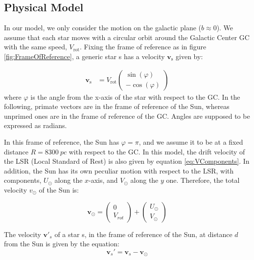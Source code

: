 \subsection{Physical Model}\label{subsec:PhysicalModel}


In our model, we only consider the motion on the galactic plane ($b\approx0$). We assume that each star moves with a circular orbit around the Galactic Center GC with the same speed, $V_{\text{rot}}$. Fixing the frame of reference as in figure \ref{fig:FrameOfReference}, a generic star s has a velocity $\bm{v}_{\text{s}}$ given by:

\begin{equation}\label{eq:VComponents}
    \begin{aligned}
        \bm{v}_{\text{s}} &= V_{\text{rot}}\begin{pmatrix} \sin(\varphi) \\ -\cos(\varphi) \end{pmatrix}
    \end{aligned}
\end{equation}
\noindent
where $\varphi$ is the angle from the x-axis of the star with respect to the GC. In the following, primate vectors are in the frame of reference of the Sun, whereas unprimed ones are in the frame of reference of the GC. Angles are supposed to be expressed as radians.

In this frame of reference, the Sun has $\varphi = \pi$, and we assume it to be at a fixed distance $R=\qty{8300}{pc}$ with respect to the GC. In this model, the drift velocity of the LSR (Local Standard of Rest) is also given by equation \ref{eq:VComponents}. In addition, the Sun has its own peculiar motion with respect to the LSR, with components, $U_{\odot}$ along the $x$-axis, and $V_{\odot}$ along the $y$ one. Therefore, the total velocity $v_{\odot}$ of the Sun is:

\begin{equation}\label{eq:VSun}
    \bm{v}_{\odot} = \begin{pmatrix} 0 \\ V_{rot} \end{pmatrix} + \begin{pmatrix} U_{\odot} \\ V_{\odot} \end{pmatrix}
\end{equation}

\noindent
The velocity $\bm{v'}_s$ of a star s, in the frame of reference of the Sun, at distance $d$ from the Sun is given by the equation:
\begin{equation}\label{eq:ReferenceFrame}
    \bm{v}_s' = \bm{v}_s - \bm{v}_{\odot} 
\end{equation}

